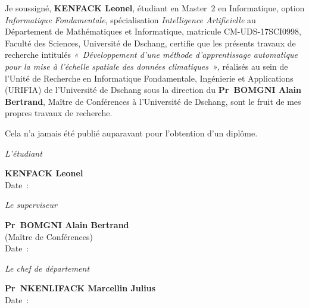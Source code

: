 \begin{SingleSpace}%
\noindent
Je soussigné, \textbf{KENFACK Leonel}, étudiant en Master~2 en Informatique, option \emph{Informatique Fondamentale}, spécialisation \emph{Intelligence Artificielle} au Département de Mathématiques et Informatique, matricule CM-UDS-17SCI0998, Faculté des Sciences, Université de Dschang, certifie que les présents travaux de recherche intitulés \emph{«~Développement d'une méthode d'apprentissage automatique pour la mise à l'échelle spatiale des données climatiques~»}, réalisés au sein de l'Unité de Recherche en Informatique Fondamentale, Ingénierie et Applications (URIFIA) de l'Université de Dschang sous la direction du \textbf{Pr~BOMGNI Alain Bertrand}, Maître de Conférences à l'Université de Dschang, sont le fruit de mes propres travaux de recherche.

\vspace{0.4em}

\noindent Cela n'a jamais été publié auparavant pour l'obtention d'un diplôme.

\vspace{1em}

\begin{center}
{\itshape L'étudiant}

\vspace{3em}

{\bfseries KENFACK Leonel}\\[0.2em]
Date~: \makebox[5cm]{\dotfill}

\vspace{1em}

{\itshape Le superviseur}

\vspace{3em}

{\bfseries Pr~BOMGNI Alain Bertrand}\\[0.2em]
{\small (Maître de Conférences)}\\[0.2em]
Date~: \makebox[5cm]{\dotfill}

\vspace{1em}

{\itshape Le chef de département}

\vspace{3em}

{\bfseries Pr~NKENLIFACK Marcellin Julius}\\[0.2em]
Date~: \makebox[5cm]{\dotfill}
\end{center}
\end{SingleSpace}

\vfill
